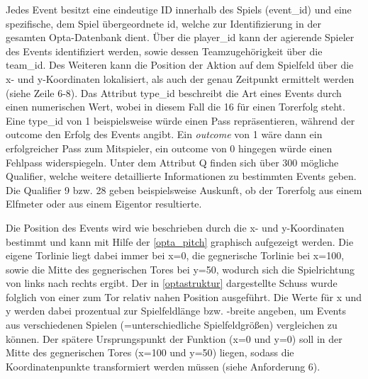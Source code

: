Jedes Event besitzt eine eindeutige ID innerhalb des Spiels (\textsf{\glqq event\_id\grqq}) und eine spezifische, dem Spiel übergeordnete \textsf{\glqq id\grqq}, welche zur Identifizierung in der gesamten Opta-Datenbank dient. Über die \textsf{\glqq player\_id\grqq} kann der agierende Spieler des Events identifiziert werden, sowie dessen Teamzugehörigkeit über die \textsf{\glqq team\_id\grqq}. Des Weiteren kann die Position der Aktion auf dem Spielfeld über die \textsf{\glqq x\grqq}- und \textsf{\glqq y\grqq}-Koordinaten lokalisiert, als auch der genau Zeitpunkt ermittelt werden (siehe Zeile 6-8). Das Attribut \textsf{\glqq type\_id\grqq} beschreibt die Art eines Events durch einen numerischen Wert, wobei in diesem Fall die \textsf{16} für einen Torerfolg steht. Eine \textsf{\glqq type\_id\grqq} von \textsf{1} beispielsweise würde einen Pass repräsentieren, während der \textsf{\glqq outcome\grqq} den Erfolg des Events angibt. Ein \textit{\glqq outcome\grqq} von \textsf{1} wäre dann ein erfolgreicher Pass zum Mitspieler, ein \textsf{\glqq outcome\grqq} von \textsf{0} hingegen würde einen Fehlpass widerspiegeln. Unter dem Attribut \textsf{\glqq Q\grqq} finden sich über 300 mögliche Qualifier, welche weitere detaillierte Informationen zu bestimmten Events geben. Die Qualifier \textsf{9} bzw. \textsf{28} geben beispielsweise Auskunft, ob der Torerfolg aus einem Elfmeter oder aus einem Eigentor resultierte.
\enlargethispage{2\baselineskip} 

Die Position des Events wird wie beschrieben durch die \textsf{\glqq x\grqq}- und \textsf{\glqq y\grqq}-Koordinaten bestimmt und kann mit Hilfe der \vref{opta_pitch} graphisch aufgezeigt werden. Die eigene Torlinie liegt dabei immer bei \textsf{x=0}, die gegnerische Torlinie bei \textsf{x=100}, sowie die Mitte des gegnerischen Tores bei \textsf{y=50}, wodurch sich die Spielrichtung von links nach rechts ergibt. Der in \vref{optastruktur} dargestellte Schuss wurde folglich von einer zum Tor relativ nahen Position ausgeführt. Die Werte für x und y werden dabei prozentual zur Spielfeldlänge bzw. -breite angeben, um Events aus verschiedenen Spielen (=unterschiedliche Spielfeldgrößen) vergleichen zu können. Der spätere Ursprungspunkt der Funktion (\textsf{x=0} und \textsf{y=0}) soll in der Mitte des gegnerischen Tores (\textsf{x=100} und \textsf{y=50}) liegen, sodass die Koordinatenpunkte transformiert werden müssen (siehe Anforderung 6).

